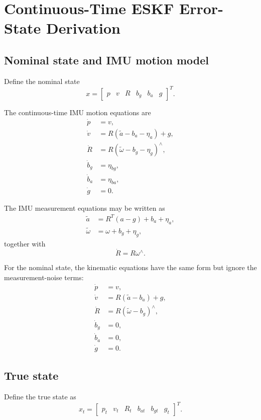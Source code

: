 \documentclass[11pt]{article}
\numberwithin{equation}{section}
\begin{document}
\section{Continuous-Time ESKF Error-State Derivation}

\subsection{Nominal state and IMU motion model}

Define the nominal state
\[
x=
\begin{bmatrix}
p & v & R & b_g & b_a & g
\end{bmatrix}^{T}.
\]

The continuous-time IMU motion equations are
\begin{align}
\dot p &= v,\\
\dot v &= R(\tilde a-b_a-\eta_a)+g,\\
\dot R &= R(\tilde\omega-b_g-\eta_g)^\wedge,\\
\dot b_g &= \eta_{bg},\\
\dot b_a &= \eta_{ba},\\
\dot g &= 0.
\end{align}

The IMU measurement equations may be written as
\begin{align}
\tilde a &= R^T(a-g)+b_a+\eta_a,\\
\tilde\omega &= \omega+b_g+\eta_g,
\end{align}
together with
\[
\dot R=R\omega^\wedge.
\]

For the nominal state, the kinematic equations have the same form but
ignore the measurement-noise terms:
\begin{align}
\dot p &= v,\\
\dot v &= R(\tilde a-b_a)+g,\\
\dot R &= R(\tilde\omega-b_g)^\wedge,\\
\dot b_g &= 0,\\
\dot b_a &= 0,\\
\dot g &= 0.
\end{align}

\subsection{True state}

Define the true state as
\[
x_t=
\begin{bmatrix}
p_t & v_t & R_t & b_{at} & b_{gt} & g_t
\end{bmatrix}^{T}.
\]
\end{document}

